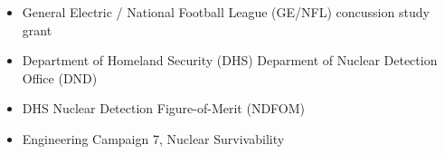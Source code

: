 \begin{itemize}
\item General Electric / National Football League (GE/NFL) concussion study grant
\item Department of Homeland Security (DHS) Deparment of Nuclear Detection Office (DND)
\item DHS Nuclear Detection Figure-of-Merit (NDFOM)
\item Engineering Campaign 7, Nuclear Survivability
\end{itemize}
